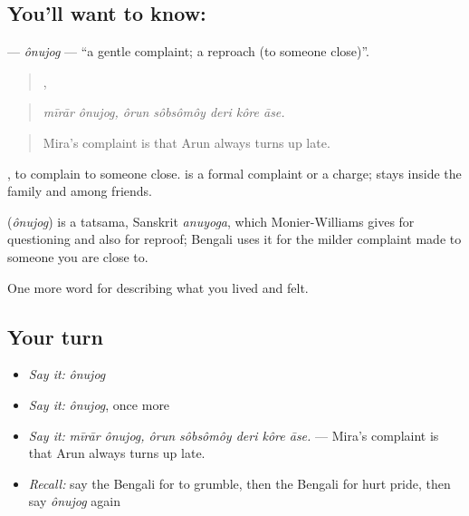 \subsection*{You'll want to know: }
\textbf{} — \emph{ônujog} — \textquotedblleft{}a gentle complaint; a reproach (to someone close)\textquotedblright{}.

\begin{quote}
 ,     
\end{quote}

\begin{quote}
\emph{mīrār ônujog, ôrun sôbsômôy deri kôre āse.}
\end{quote}

\begin{quote}
Mira's complaint is that Arun always turns up late.
\end{quote}

 , to complain to someone close.  is a formal complaint or a charge;  stays inside the family and among friends.

\begin{cousinweb}
\textbf{} (\emph{ônujog}) is a tatsama, Sanskrit \emph{anuyoga}, which Monier-Williams gives for questioning and also for reproof; Bengali uses it for the milder complaint made to someone you are close to.
\end{cousinweb}

\begin{grammarlens}[title={What you've built}]
One more word for describing what you lived and felt.
\end{grammarlens}

\subsection*{Your turn}
\begin{itemize}
\raggedright
  \item \emph{Say it:} \emph{ônujog}
  \item \emph{Say it:} \emph{ônujog}, once more
  \item \emph{Say it:} \emph{mīrār ônujog, ôrun sôbsômôy deri kôre āse.} — Mira's complaint is that Arun always turns up late.
  \item \emph{Recall:} say the Bengali for to grumble, then the Bengali for hurt pride, then say \emph{ônujog} again
\end{itemize}

